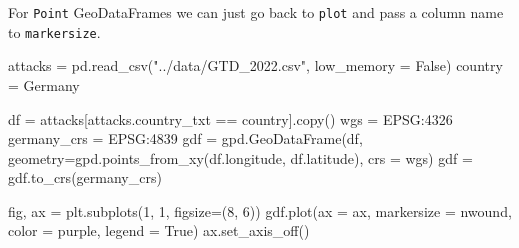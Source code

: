 \documentclass[
  letterpaper,
  DIV=11,
  numbers=noendperiod]{scrreprt}
\newenvironment{Shaded}{\begin{snugshade}}{\end{snugshade}}
\newcommand{\DecValTok}[1]{\textcolor[rgb]{0.68,0.00,0.00}{#1}}
\newcommand{\NormalTok}[1]{\textcolor[rgb]{0.00,0.23,0.31}{#1}}
\newcommand{\OperatorTok}[1]{\textcolor[rgb]{0.37,0.37,0.37}{#1}}
\newcommand{\StringTok}[1]{\textcolor[rgb]{0.13,0.47,0.30}{#1}}
\newcommand{\VariableTok}[1]{\textcolor[rgb]{0.07,0.07,0.07}{#1}}
\begin{document}
For \texttt{Point} GeoDataFrames we can just go back to \texttt{plot}
and pass a column name to \texttt{markersize}.

\begin{Shaded}
\begin{Highlighting}[]
\NormalTok{attacks }\OperatorTok{=}\NormalTok{ pd.read\_csv(}\StringTok{"../data/GTD\_2022.csv"}\NormalTok{, low\_memory }\OperatorTok{=} \VariableTok{False}\NormalTok{)}
\NormalTok{country }\OperatorTok{=} \StringTok{\textquotesingle{}Germany\textquotesingle{}}

\NormalTok{df }\OperatorTok{=}\NormalTok{ attacks[attacks.country\_txt }\OperatorTok{==}\NormalTok{ country].copy()}
\NormalTok{wgs }\OperatorTok{=} \StringTok{\textquotesingle{}EPSG:4326\textquotesingle{}}
\NormalTok{germany\_crs }\OperatorTok{=} \StringTok{\textquotesingle{}EPSG:4839\textquotesingle{}}
\NormalTok{gdf }\OperatorTok{=}\NormalTok{ gpd.GeoDataFrame(df, geometry}\OperatorTok{=}\NormalTok{gpd.points\_from\_xy(df.longitude, df.latitude), crs }\OperatorTok{=}\NormalTok{ wgs)}
\NormalTok{gdf }\OperatorTok{=}\NormalTok{ gdf.to\_crs(germany\_crs)}
\end{Highlighting}
\end{Shaded}

\begin{Shaded}
\begin{Highlighting}[]
\NormalTok{fig, ax }\OperatorTok{=}\NormalTok{ plt.subplots(}\DecValTok{1}\NormalTok{, }\DecValTok{1}\NormalTok{, figsize}\OperatorTok{=}\NormalTok{(}\DecValTok{8}\NormalTok{, }\DecValTok{6}\NormalTok{))}
\NormalTok{gdf.plot(ax }\OperatorTok{=}\NormalTok{ ax, markersize }\OperatorTok{=} \StringTok{\textquotesingle{}nwound\textquotesingle{}}\NormalTok{, color }\OperatorTok{=} \StringTok{\textquotesingle{}purple\textquotesingle{}}\NormalTok{, legend }\OperatorTok{=} \VariableTok{True}\NormalTok{)}
\NormalTok{ax.set\_axis\_off()}
\end{Highlighting}
\end{Shaded}
\end{document}

